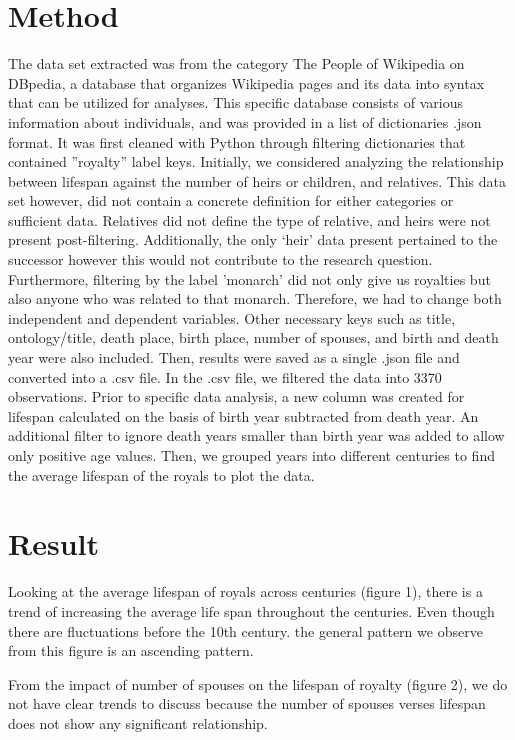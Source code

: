 \documentclass{article}
\begin{document}
\section{Method}
The data set extracted was from the category The People of Wikipedia on DBpedia, a database that organizes Wikipedia pages and its data into syntax that can be utilized for analyses. This specific database  consists of various information about individuals, and was provided in a list of dictionaries .json format. It was first cleaned with Python through filtering dictionaries that contained ”royalty” label keys. Initially, we considered analyzing the relationship between lifespan against the number of heirs or children, and relatives. This data set however, did not contain a concrete definition for either categories or sufficient data. Relatives did not define the type of relative, and heirs were not present post-filtering.  Additionally, the only ‘heir’ data present pertained to the successor however this would not contribute to the research question. Furthermore, filtering by the label 'monarch' did not only give us royalties but also anyone who was related to that monarch. Therefore, we had to change both independent and dependent variables. Other necessary keys such as title, ontology/title, death place, birth place, number of spouses, and birth and death year were also included. Then, results were saved as a single .json file and converted into a .csv file. In the .csv file, we filtered the data into 3370 observations. Prior to specific data analysis,  a new column was created for lifespan calculated on the basis of birth year subtracted from death year.  An additional filter to ignore death years smaller than birth year was added to allow only positive age values. Then, we grouped years into different centuries to find the average lifespan of the royals to plot the data.

\section{Result}
Looking at the average lifespan of royals across centuries (figure 1), there is a trend of increasing the average life span throughout the centuries. Even though there are fluctuations before the 10th century. the general pattern we observe from this figure is an ascending pattern. 

From the impact of number of spouses on the lifespan of royalty (figure 2), we do not have clear trends to discuss because the number of spouses verses lifespan does not show any significant relationship. 
\end{document}
